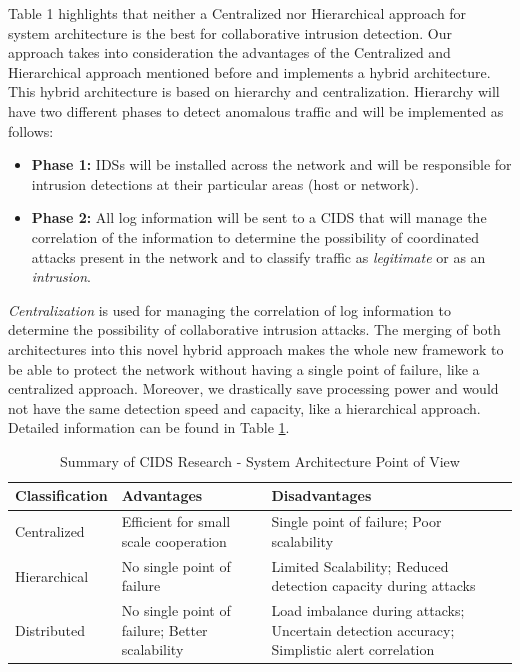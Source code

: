 \documentclass[conference]{IEEEtran}
\begin{document}
Table 1 highlights that neither a Centralized nor Hierarchical approach for system architecture is the best for collaborative intrusion detection.  Our approach takes into consideration the advantages of the Centralized and Hierarchical approach mentioned before and implements a hybrid architecture. This hybrid architecture is based on hierarchy and centralization.  Hierarchy will have two different phases to detect anomalous traffic and will be implemented as follows:
\begin{itemize}
\item \textbf{Phase 1:} IDSs will be installed across the network and will be responsible for intrusion detections at their particular areas (host or network).  
\item \textbf{Phase 2:} All log information will be sent to a CIDS that will manage the correlation of the information to determine the possibility of coordinated attacks present in the network and to classify traffic as \emph{legitimate} or as an \emph{intrusion}.
\end{itemize}

\textit{Centralization} is used for managing the correlation of log information to determine the possibility of collaborative intrusion attacks.  The merging of both architectures into this novel hybrid approach makes the whole new framework to be able to protect the network without having a single point of failure, like a centralized approach.  Moreover, we drastically save processing power and would not have the same detection speed and capacity, like a hierarchical approach.  Detailed information can be found in Table \ref{sumcids}.
\begin{table}[h!]
\caption{Summary of CIDS Research - System Architecture Point of View}
\label{sumcids}
\begin{tabular}{p{2.5cm}p{2.3cm}p{2.8cm}}
\hline
Classification & Advantages & Disadvantages \\
\hline
Centralized & Efficient for small scale cooperation & Single point of failure; Poor scalability \\
Hierarchical & No single point of failure & Limited Scalability; Reduced detection capacity during attacks \\
Distributed & No single point of failure; Better scalability & Load imbalance during attacks; Uncertain detection accuracy; Simplistic alert correlation \\
\hline
\end{tabular}
\end{table}
\end{document}
